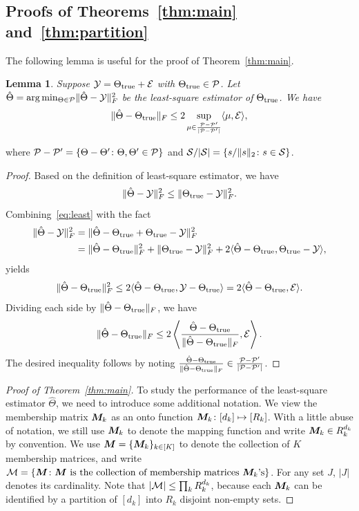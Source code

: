 \documentclass{article}
\newtheorem{lemma}{Lemma}
\begin{document}
\begin{appendices}
\subsection{Proofs of Theorems~\ref{thm:main} and~\ref{thm:partition}}
The following lemma is useful for the proof of Theorem~\ref{thm:main}.
\begin{lemma} \label{lem:high}
Suppose $\mathcal{Y}=\Theta_{\text{true}}+\mathcal{E}$ with $\Theta_{\text{true}}\in\mathcal{P}$. Let $\hat \Theta=\arg\min_{\Theta \in \mathcal{P}}\lVert\hat \Theta-\mathcal{Y}\rVert_F^2$ be the least-square estimator of $\Theta_{\text{true}}$. We have
\[
\lVert\hat \Theta-\Theta_{\text{true}}\rVert_F\leq 2\sup_{\mu \in { \mathcal{P}-\mathcal{P}'\over |\mathcal{P}-\mathcal{P}'|}}\langle \mu, \mathcal{E} \rangle,
\]
\end{lemma}
where $\mathcal{P}-\mathcal{P}'=\{\Theta-\Theta'\colon \Theta, \Theta'\in \mathcal{P}\}$ and $\mathcal{S}/|\mathcal{S}|=\{s/\lVert s\rVert_2\colon s\in \mathcal{S}\}$.
\begin{proof} Based on the definition of least-square estimator, we have
\begin{equation}\label{eq:least}
\lVert\hat \Theta-\mathcal{Y}\rVert_F^2\leq \lVert\Theta_{\text{true}}-\mathcal{Y}\rVert_F^2.
\end{equation}
Combining~\eqref{eq:least} with the fact 
\begin{align}
\lVert\hat \Theta -\mathcal{Y}\rVert_F^2&=\lVert\hat \Theta-\Theta_{\text{true}}+\Theta_{\text{true}}-\mathcal{Y}\rVert_F^2\\
&=\lVert\hat \Theta-\Theta_{\text{true}}\rVert_F^2+\lVert\Theta_{\text{true}}-\mathcal{Y}\rVert_F^2+2\langle \hat \Theta-\Theta_{\text{true}}, \Theta_{\text{true}}-\mathcal{Y}\rangle,
\end{align}
yields
\[
\lVert\hat \Theta-\Theta_{\text{true}}\rVert_F^2\leq 2\langle \hat \Theta-\Theta_{\text{true}}, \mathcal{Y}-\Theta_{\text{true}}\rangle=2\langle \hat \Theta-\Theta_{\text{true}}, \mathcal{E}\rangle.
\]
Dividing each side by $\lVert\hat \Theta-\Theta_{\text{true}}\rVert_F$, we have
\[
\lVert\hat \Theta-\Theta_{\text{true}}\rVert_F\leq 2\left \langle {\hat \Theta-\Theta_{\text{true}}\over \lVert\hat \Theta-\Theta_{\text{true}}\rVert_F}, \mathcal{E}\right \rangle.
\]
The desired inequality follows by noting ${\hat \Theta-\Theta_{\text{true}} \over \lVert\hat \Theta-\Theta_{\text{true}}\rVert_F}\in {\mathcal{P}-\mathcal{P}'\over |\mathcal{P}-\mathcal{P}'|}$. 
\end{proof}

\begin{proof}[Proof of Theorem~\ref{thm:main}]
To study the performance of the least-square estimator $\hat \Theta$, we need to introduce some additional notation. We view the membership matrix $\bm M_k$ as an onto function $\bm M_k\colon [d_k]\mapsto [R_k]$. With a little abuse of notation, we still use $\bm M_k$ to denote the mapping function and write $\bm M_k\in R_k^{d_k}$ by convention. We use $\bm M=\{\bm M_k\}_{k\in[K]}$ to denote the collection of $K$ membership matrices, and write $\mathcal{M}=\{\bm M \colon \text{$\bm M$ is the collection of membership matrices $\bm M_k$'s}\}$. For any set $J$, $|J|$ denotes its cardinality. Note that $|\mathcal{M}|\leq \prod_k R_k^{d_k}$, because each $\bm M_k$ can be identified by a partition of $[d_k]$ into $R_k$ disjoint non-empty sets. 


\end{proof}
\end{appendices}
\end{document}
